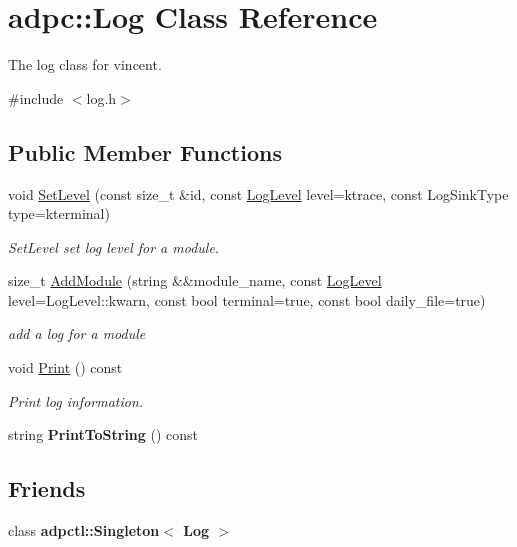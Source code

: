 \hypertarget{classadpc_1_1Log}{}\section{adpc\+:\+:Log Class Reference}
\label{classadpc_1_1Log}


The log class for vincent.  




{\ttfamily \#include $<$log.\+h$>$}

\subsection*{Public Member Functions}
\begin{DoxyCompactItemize}
\item 
void \hyperlink{classadpc_1_1Log_aef0274bae7eb7286d090bb1953c2bc29}{Set\+Level} (const size\+\_\+t \&id, const \hyperlink{log__config_8h_a172986fa5f658c5fe0b42bd954e9e133}{Log\+Level} level=ktrace, const Log\+Sink\+Type type=kterminal)
\begin{DoxyCompactList}\small\item\em Set\+Level set log level for a module. \end{DoxyCompactList}\item 
size\+\_\+t \hyperlink{classadpc_1_1Log_a6b5cdb7e0f4a7cd5f29d031af4800ea7}{Add\+Module} (string \&\&module\+\_\+name, const \hyperlink{log__config_8h_a172986fa5f658c5fe0b42bd954e9e133}{Log\+Level} level=Log\+Level\+::kwarn, const bool terminal=true, const bool daily\+\_\+file=true)
\begin{DoxyCompactList}\small\item\em add a log for a module \end{DoxyCompactList}\item 
\mbox{\label{classadpc_1_1Log_a141d290696fb2b91b637792612192de6}} 
void \hyperlink{classadpc_1_1Log_a141d290696fb2b91b637792612192de6}{Print} () const
\begin{DoxyCompactList}\small\item\em Print log information. \end{DoxyCompactList}\item 
\mbox{\label{classadpc_1_1Log_ac1a923e5fbfbaf677d801ebcc4be4131}} 
string {\bfseries Print\+To\+String} () const
\end{DoxyCompactItemize}
\subsection*{Friends}
\begin{DoxyCompactItemize}
\item 
\mbox{\label{classadpc_1_1Log_a0e7b4c16064e3789d935b1b3523d78c7}} 
class {\bfseries adpctl\+::\+Singleton$<$ Log $>$}
\end{DoxyCompactItemize}


